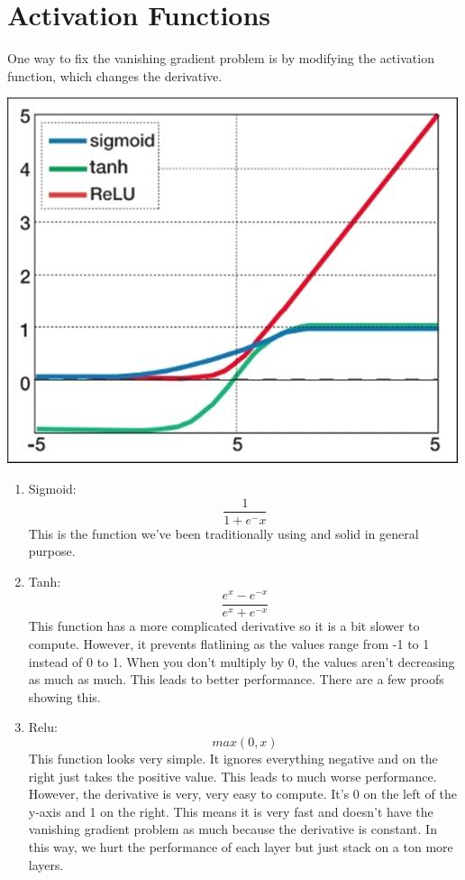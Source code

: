 \documentclass{article}
\begin{document}
\section{Activation Functions}
    One way to fix the vanishing gradient problem is by modifying the activation function, which changes the derivative. 
    \begin{center}
    \includegraphics[scale=0.7]{activation.jpg}
    \end{center}
    
    \begin{enumerate}
        \item Sigmoid: $$\frac{1}{1+e^-x}$$
        This is the function we've been traditionally using and solid in general purpose.
        \item Tanh: $$\frac{e^x-e^{-x}}{e^x+e^{-x}}$$
        This function has a more complicated derivative so it is a bit slower to compute. However, it prevents flatlining as the values range from -1 to 1 instead of 0 to 1. When you don't multiply by 0, the values aren't decreasing as much as much. This leads to better performance. There are a few proofs showing this.
        \item Relu: $$max(0,x)$$
        This function looks very simple. It ignores everything negative and on the right just takes the positive value. This leads to much worse performance. However, the derivative is very, very easy to compute. It's 0 on the left of the y-axis and 1 on the right. This means it is very fast and doesn't have the vanishing gradient problem as much because the derivative is constant. In this way, we hurt the performance of each layer but just stack on a ton more layers.
    \end{enumerate}
\end{document}
